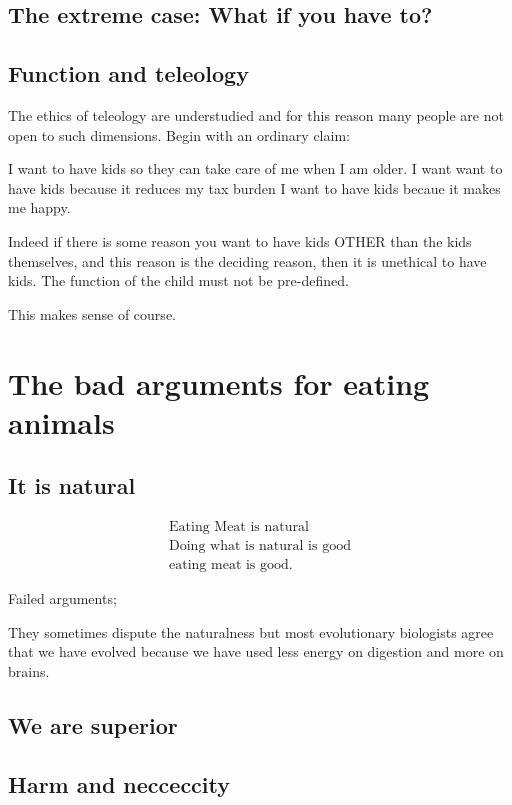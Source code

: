 \documentclass[12pt]{report}
\numberwithin{equation}{section}
\begin{document}
\section{The extreme case: What if you have to?}

\section{Function and teleology}

The ethics of teleology are understudied and for this reason many people are not open to such dimensions. Begin with an ordinary claim:

I want to have kids so they can take care of me when I am older.
I want want to have kids because it reduces my tax burden
I want to have kids becaue it makes me happy. 

Indeed if there is some reason you want to have kids OTHER than the kids themselves, and this reason is the deciding reason, then it is unethical to have kids. The function of the child must not be pre-defined. 

This makes sense of course. 

\chapter{The bad arguments for eating animals}

\section{It is natural}

\begin{align}
\text{Eating Meat is natural} \\
\text{Doing what is natural is good} \\
\text{eating meat is good.}
\end{align}

Failed arguments;


They sometimes dispute the naturalness but most evolutionary biologists agree that we have evolved because we have used less energy on digestion and more on brains.  

\section{We are superior}




\section{Harm and necceccity}
\end{document}
